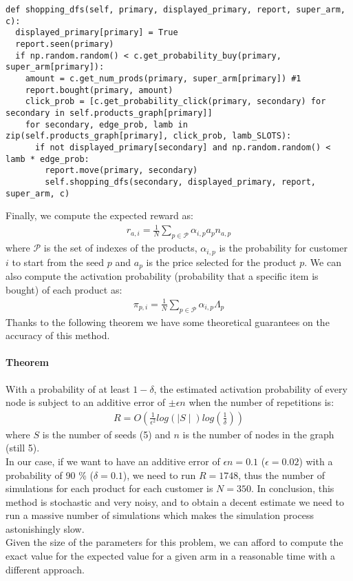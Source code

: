 \begin{verbatim}
def shopping_dfs(self, primary, displayed_primary, report, super_arm, c):
  displayed_primary[primary] = True
  report.seen(primary)
  if np.random.random() < c.get_probability_buy(primary, super_arm[primary]):
    amount = c.get_num_prods(primary, super_arm[primary]) #1
    report.bought(primary, amount)
    click_prob = [c.get_probability_click(primary, secondary) for secondary in self.products_graph[primary]]
    for secondary, edge_prob, lamb in zip(self.products_graph[primary], click_prob, lamb_SLOTS):
      if not displayed_primary[secondary] and np.random.random() < lamb * edge_prob:
        report.move(primary, secondary)
        self.shopping_dfs(secondary, displayed_primary, report, super_arm, c)
\end{verbatim}
 \newpage
Finally, we compute the expected reward as:
\begin{align*}
    r_{a, i} = \frac{1}{N}\sum_{p \in \mathcal{P}}\alpha_{i, p} a_{p} n_{a, p}
\end{align*}
where $\mathcal{P}$ is the set of indexes of the products, $\alpha_{i, p}$ is the probability for customer $i$ to start from the seed $p$ and $a_{p}$ is the price selected for the product $p$. We can also compute the activation probability (probability that a specific item is bought) of each product as:
\begin{align*}
    \pi_{p, i} = \frac{1}{N}\sum_{p \in \mathcal{P}}\alpha_{i, p} \Lambda_p
\end{align*}
Thanks to the following theorem we have some theoretical guarantees on the accuracy of this method.
\paragraph{Theorem}
With a probability of at least $1 - \delta$, the estimated activation probability of every node is subject to an additive error of $\pm \epsilon n$ when the number of repetitions is:
\begin{align*}
    R = O(\frac{1}{\epsilon^2}log(\mid S \mid)log(\frac{1}{\delta}))
\end{align*}
where $S$ is the number of seeds (5) and $n$ is the number of nodes in the graph (still 5).\\

In our case, if we want to have an additive error of $\epsilon n = 0.1$ ($\epsilon = 0.02$) with a probability of 90 \% ($\delta=0.1$), we need to run $R=1748$, thus the number of simulations for each product for each customer is $N=350$.
In conclusion, this method is stochastic and very noisy, and to obtain a decent estimate we need to run a massive number of simulations which makes the simulation process astonishingly slow.\\
Given the size of the parameters for this problem, we can afford to compute the exact value for the expected value for a given arm in a reasonable time with a different approach.

